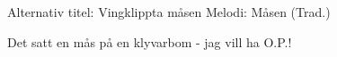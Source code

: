 \begin{song}

\begin{songmeta}
Alternativ titel: Vingklippta måsen
Melodi: Måsen (Trad.)
\end{songmeta}

\begin{songtext}
Det satt en mås på en klyvarbom
- jag vill ha O.P.!
\end{songtext}

\begin{songnotes}
\end{songnotes}

\end{song}
